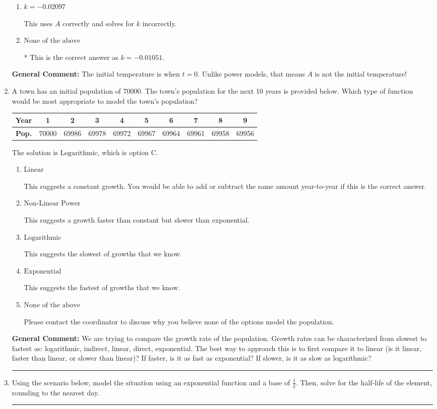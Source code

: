 \documentclass{extbook}[14pt]
\newcommand{\litem}[1]{\item #1

\rule{\textwidth}{0.4pt}}
\begin{document}
\begin{enumerate}
{\begin{enumerate}[label=\Alph*.]
This uses $A$ as the initial temperature and solves for $k$ incorrectly.
\item \( k = -0.02097 \)

This uses $A$ correctly and solves for $k$ incorrectly.
\item \( \text{None of the above} \)

* This is the correct answer as $k = -0.01051$.
\end{enumerate}

\textbf{General Comment:} The initial temperature is when $t = 0$. Unlike power models, that means $A$ is not the initial temperature!
}
\litem{
A town has an initial population of 70000. The town's population for the next 10 years is provided below. Which type of function would be most appropriate to model the town's population?



\begin{tabular}{c|c|c|c|c|c|c|c|c|c}
\textbf{Year} & 1 & 2 & 3 & 4 & 5 & 6 & 7 & 8 & 9 \tabularnewline
\hline
\textbf{Pop.} & 70000 & 69986 & 69978 & 69972 & 69967 & 69964 & 69961 & 69958 & 69956
\end{tabular} 

The solution is \( \text{Logarithmic} \), which is option C.\begin{enumerate}[label=\Alph*.]
\item \( \text{Linear} \)

This suggests a constant growth. You would be able to add or subtract the same amount year-to-year if this is the correct answer.
\item \( \text{Non-Linear Power} \)

This suggests a growth faster than constant but slower than exponential.
\item \( \text{Logarithmic} \)

This suggests the slowest of growths that we know.
\item \( \text{Exponential} \)

This suggests the fastest of growths that we know.
\item \( \text{None of the above} \)

Please contact the coordinator to discuss why you believe none of the options model the population.
\end{enumerate}

\textbf{General Comment:} We are trying to compare the growth rate of the population. Growth rates can be characterized from slowest to fastest as: logarithmic, indirect, linear, direct, exponential. The best way to approach this is to first compare it to linear (is it linear, faster than linear, or slower than linear)? If faster, is it as fast as exponential? If slower, is it as slow as logarithmic?
}
\litem{
Using the scenario below, model the situation using an exponential function and a base of $\frac{1}{2}$. Then, solve for the half-life of the element, rounding to the nearest day.

}
\end{enumerate}
\end{document}

